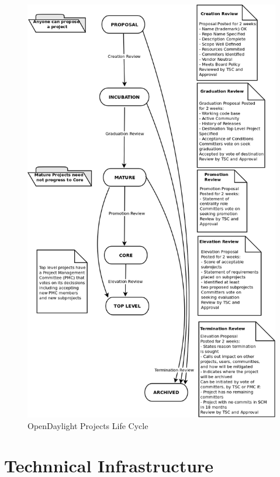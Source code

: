 \documentclass[a4paper, 12pt]{book}
\begin{document}
\begin{center}
 \begin{figure}[H]
 \begin{center}
   \includegraphics[width=14cm]{img/odl-proj-lifecycle-00.png}
   \caption{OpenDaylight Projects Life Cycle}
   \label{fig:odl_tech_proj_life_diagram}
 \end{center}
 \end{figure}
\end{center}

\section{Technnical Infrastructure}
\label{chap:odltech_infrastructure}
\end{document}
